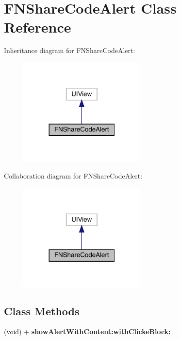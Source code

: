 \hypertarget{interface_f_n_share_code_alert}{}\section{F\+N\+Share\+Code\+Alert Class Reference}
\label{interface_f_n_share_code_alert}


Inheritance diagram for F\+N\+Share\+Code\+Alert\+:\nopagebreak
\begin{figure}[H]
\begin{center}
\leavevmode
\includegraphics[width=180pt]{interface_f_n_share_code_alert__inherit__graph}
\end{center}
\end{figure}


Collaboration diagram for F\+N\+Share\+Code\+Alert\+:\nopagebreak
\begin{figure}[H]
\begin{center}
\leavevmode
\includegraphics[width=180pt]{interface_f_n_share_code_alert__coll__graph}
\end{center}
\end{figure}
\subsection*{Class Methods}
\begin{DoxyCompactItemize}
\item 
\mbox{\label{interface_f_n_share_code_alert_adf1f77fdc9585552cbb20d614bc627f5}} 
(void) + {\bfseries show\+Alert\+With\+Content\+:with\+Clicke\+Block\+:}
\end{DoxyCompactItemize}
